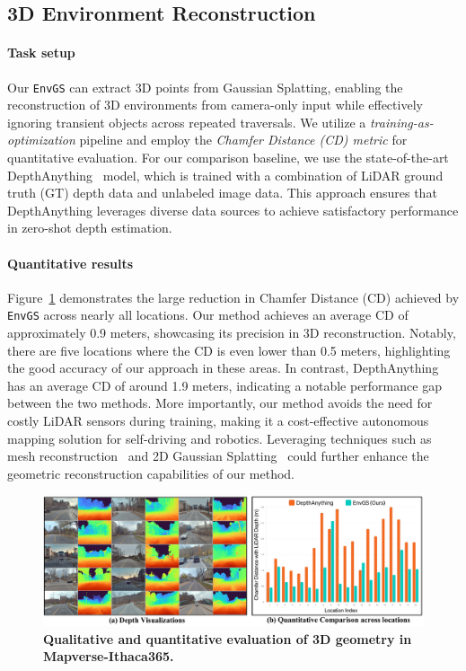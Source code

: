 \subsection{3D Environment Reconstruction}
\label{subsec:reconstruction}
\paragraph{Task setup} Our \texttt{EnvGS} can extract 3D points from Gaussian Splatting, enabling the reconstruction of 3D environments from camera-only input while effectively ignoring transient objects across repeated traversals. We utilize a \textit{training-as-optimization} pipeline and employ the \textit{Chamfer Distance (CD) metric} for quantitative evaluation. For our comparison baseline, we use the state-of-the-art DepthAnything~\cite{depthanything} model, which is trained with a combination of LiDAR ground truth (GT) depth data and unlabeled image data. This approach ensures that DepthAnything leverages diverse data sources to achieve satisfactory performance in zero-shot depth estimation.


\paragraph{Quantitative results} Figure~\ref{fig:depth} demonstrates the large reduction in Chamfer Distance (CD) achieved by \texttt{EnvGS} across nearly all locations. Our method achieves an average CD of approximately 0.9 meters, showcasing its precision in 3D reconstruction. Notably, there are five locations where the CD is even lower than 0.5 meters, highlighting the good accuracy of our approach in these areas. In contrast, DepthAnything has an average CD of around 1.9 meters, indicating a notable performance gap between the two methods. More importantly, our method avoids the need for costly LiDAR sensors during training, making it a cost-effective autonomous mapping solution for self-driving and robotics. Leveraging techniques such as mesh reconstruction~\cite{guedon2023sugar} and 2D Gaussian Splatting~\cite{Huang2DGS2024} could further enhance the geometric reconstruction capabilities of our method.


\begin{figure}[t]
    \centering
    \includegraphics[width=\linewidth]{figs_compressed/depth_comb_compressed.pdf}
    \caption{\textbf{Qualitative and quantitative evaluation of 3D geometry in Mapverse-Ithaca365.}}
    \label{fig:depth}
\end{figure}

